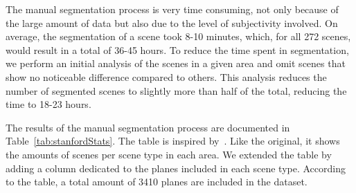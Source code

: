 \documentclass[main.tex]{subfiles}
\begin{document}
The manual segmentation process is very time consuming, not only because of the large amount of data but also due
to the level of subjectivity involved.
On average, the segmentation of a scene took 8-10 minutes, which, for all 272 scenes,
would result in a total of 36-45 hours. To reduce the time spent in segmentation, we perform an initial analysis of the scenes in a given area
and omit scenes that show no noticeable difference compared to others. This analysis reduces the number of segmented scenes to slightly more than half
of the total, reducing the time to 18-23 hours.

The results of the manual segmentation process are documented in Table~\ref{tab:stanfordStats}.
The table is inspired by~\cite[Table~7]{2017arXiv170201105A}. Like the original, it shows the amounts of scenes per scene type in each area.
We extended the table by adding a column dedicated to the planes included in each scene type. According to the table, a total amount of 3410 planes
are included in the dataset.
\end{document}
